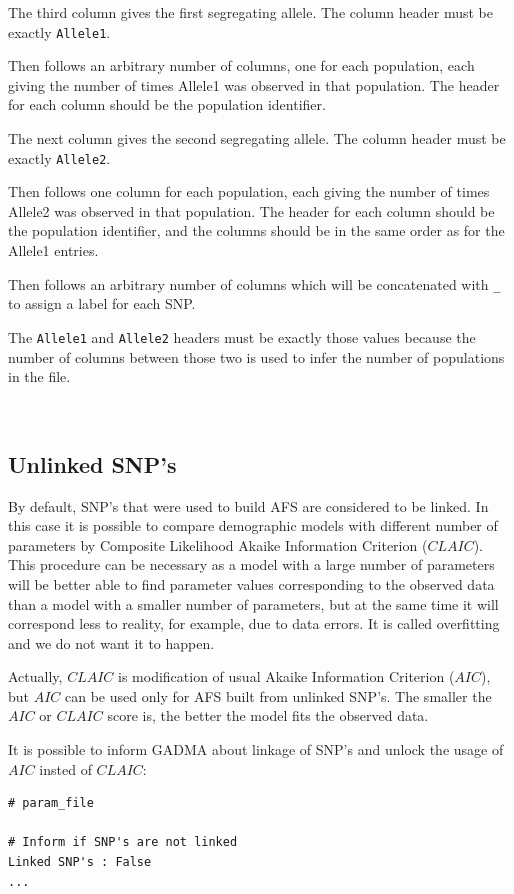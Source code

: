 \documentclass[12pt]{article}
\makeatletter
\newcommand{\py}[1]{\lstinline[language=Python, showstringspaces=False]@#1@}
\makeatother
\begin{document}
The third column gives the first segregating allele.
The column header must be exactly \py{Allele1}.

Then follows an arbitrary number of columns, one for each population, each giving the number of times Allele1 was observed in that population.
The header for each column should be the population identifier.

The next column gives the second segregating allele.
The column header must be exactly \py{Allele2}.

Then follows one column for each population, each giving the number of times Allele2 was observed in that population.
The header for each column should be the population identifier, and the columns should be in the same order as for the Allele1 entries.

Then follows an arbitrary number of columns which will be concatenated with \py{_} to assign a label for each SNP.

The \py{Allele1} and \py{Allele2} headers must be exactly those values because the number of columns between those two is used to infer the number of populations in the file.

~\
\subsection{Unlinked SNP's}

By default, SNP's that were used to build AFS are considered to be linked. In this case it is possible to compare demographic models with different number of parameters by Composite Likelihood Akaike Information Criterion ($CLAIC$). This procedure can be necessary as a model with a large number of parameters will be better able to find parameter values corresponding to the observed data than a model with a smaller number of parameters, but at the same time it will correspond less to reality, for example, due to data errors. It is called overfitting and we do not want it to happen.

Actually, $CLAIC$ is modification of usual Akaike Information Criterion ($AIC$), but $AIC$ can be used only for AFS built from unlinked SNP's. The smaller the $AIC$ or $CLAIC$ score is, the better the model fits the observed data.

It is possible to inform GADMA about linkage of SNP's and unlock the usage of $AIC$ insted of $CLAIC$:

\begin{lstlisting}
# param_file

# Inform if SNP's are not linked
Linked SNP's : False
...
\end{lstlisting}
\end{document}
